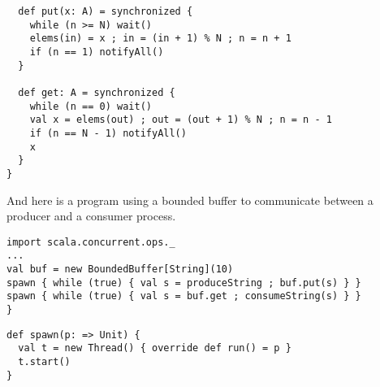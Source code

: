 \begin{itemize}
\begin{lstlisting}
  def put(x: A) = synchronized {
    while (n >= N) wait()
    elems(in) = x ; in = (in + 1) % N ; n = n + 1
    if (n == 1) notifyAll()
  }

  def get: A = synchronized {
    while (n == 0) wait()
    val x = elems(out) ; out = (out + 1) % N ; n = n - 1
    if (n == N - 1) notifyAll()
    x
  }
}
\end{lstlisting}
And here is a program using a bounded buffer to communicate between a
producer and a consumer process.
\begin{lstlisting}
import scala.concurrent.ops._
...
val buf = new BoundedBuffer[String](10)
spawn { while (true) { val s = produceString ; buf.put(s) } }
spawn { while (true) { val s = buf.get ; consumeString(s) } }
}
\end{lstlisting}
\begin{lstlisting}
def spawn(p: => Unit) {
  val t = new Thread() { override def run() = p }
  t.start()
}
\end{lstlisting}





\end{itemize}
